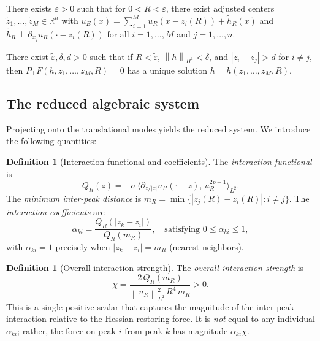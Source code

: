 \documentclass[11pt]{article}
\theoremstyle{plain}%
\theoremstyle{definition}%
\newtheorem{defn}[thm]{Definition}%
\theoremstyle{definition}%
\theoremstyle{remark}%
\numberwithin{equation}{section}
\newcommand{\R}{\mathbb{R}}
\newcommand{\norm}[1]{\left\| #1 \right\|}
\begin{document}
\begin{lem}\label{lem:LS1}
There exists $\varepsilon>0$ such that for $0<R<\varepsilon$, there exist adjusted centers $\tilde{z}_1,\ldots,\tilde{z}_M\in\R^n$ with $u_E(x) = \sum_{i=1}^{M} u_R(x-z_i(R)) + \tilde{h}_R(x)$ and $\tilde{h}_R\perp \partial_{x_j} u_R(\cdot - z_i(R))$ for all $i=1,\ldots,M$ and $j=1,\ldots,n$.
\end{lem}

\begin{lem}\label{lem:LS2}
There exist $\tilde{\varepsilon},\delta,d>0$ such that if $R<\tilde{\varepsilon}$, $\norm{h}_{H^1}<\delta$, and $|z_i-z_j|>d$ for $i\neq j$, then $P_\perp F(h,z_1,\ldots,z_M,R)=0$ has a unique solution $h=h(z_1,\ldots,z_M,R)$.
\end{lem}


\subsection{The reduced algebraic system}\label{subsec:reduced}

Projecting onto the translational modes yields the reduced system. We introduce the following quantities:

\begin{defn}[Interaction functional and coefficients]\label{def:interaction}
The \emph{interaction functional} is
\[
Q_R(z) = -\sigma\,\bigl\langle \partial_{z/|z|} u_R(\cdot - z),\, u_R^{2p+1} \bigr\rangle_{L^2}.
\]
The \emph{minimum inter-peak distance} is $m_R = \min\{|z_j(R)-z_i(R)| : i\neq j\}$. The \emph{interaction coefficients} are
\begin{equation}\label{eq:alpha-def}
\alpha_{ki} = \frac{Q_R(|z_k-z_i|)}{Q_R(m_R)}, \quad\text{satisfying } 0\leq\alpha_{ki}\leq 1,
\end{equation}
with $\alpha_{ki}=1$ precisely when $|z_k-z_i|=m_R$ (nearest neighbors).
\end{defn}

\begin{defn}[Overall interaction strength]\label{def:chi}
The \emph{overall interaction strength} is
\begin{equation}\label{eq:chi-def}
\chi = \frac{2\,Q_R(m_R)}{\norm{u_R}_{L^2}^2\,R^4\,m_R} > 0.
\end{equation}
This is a single positive scalar that captures the magnitude of the inter-peak interaction relative to the Hessian restoring force. It is \emph{not} equal to any individual $\alpha_{ki}$; rather, the force on peak $i$ from peak $k$ has magnitude $\alpha_{ki}\chi$.
\end{defn}
\end{document}
